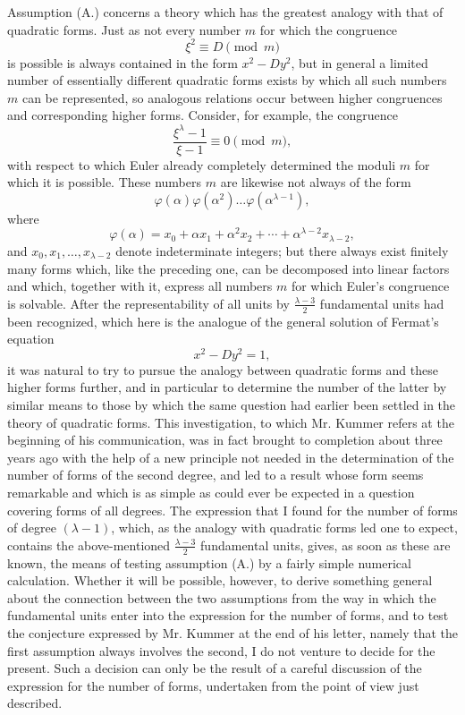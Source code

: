 \documentclass[11pt]{article}
\begin{document}
Assumption (A.) concerns a theory which has the greatest analogy with that of quadratic forms. Just as not every number $m$ for which the congruence
\[
\xi^2 \equiv D \pmod{m}
\]
is possible is always contained in the form $x^2-Dy^2$, but in general a limited number of essentially different quadratic forms exists by which all such numbers $m$ can be represented, so analogous relations occur between higher congruences and corresponding higher forms. Consider, for example, the congruence
\[
\frac{\xi^\lambda-1}{\xi-1}\equiv 0 \pmod{m},
\]
with respect to which Euler already completely determined the moduli $m$ for which it is possible. These numbers $m$ are likewise not always of the form
\[
\varphi(\alpha)\varphi(\alpha^2)\ldots\varphi(\alpha^{\lambda-1}),
\]
where
\[
\varphi(\alpha)=x_0+\alpha x_1+\alpha^2x_2+\cdots+\alpha^{\lambda-2}x_{\lambda-2},
\]
and $x_0,x_1,\ldots,x_{\lambda-2}$ denote indeterminate integers; but there always exist finitely many forms which, like the preceding one, can be decomposed into linear factors and which, together with it, express all numbers $m$ for which Euler's congruence is solvable. After the representability of all units by $\frac{\lambda-3}{2}$ fundamental units had been recognized, which here is the analogue of the general solution of Fermat's equation
\[
x^2-Dy^2=1,
\]
it was natural to try to pursue the analogy between quadratic forms and these higher forms further, and in particular to determine the number of the latter by similar means to those by which the same question had earlier been settled in the theory of quadratic forms. This investigation, to which Mr. Kummer refers at the beginning of his communication, was in fact brought to completion about three years ago with the help of a new principle not needed in the determination of the number of forms of the second degree, and led to a result whose form seems remarkable and which is as simple as could ever be expected in a question covering forms of all degrees. The expression that I found for the number of forms of degree $(\lambda-1)$, which, as the analogy with quadratic forms led one to expect, contains the above-mentioned $\frac{\lambda-3}{2}$ fundamental units, gives, as soon as these are known, the means of testing assumption (A.) by a fairly simple numerical calculation. Whether it will be possible, however, to derive something general about the connection between the two assumptions from the way in which the fundamental units enter into the expression for the number of forms, and to test the conjecture expressed by Mr. Kummer at the end of his letter, namely that the first assumption always involves the second, I do not venture to decide for the present. Such a decision can only be the result of a careful discussion of the expression for the number of forms, undertaken from the point of view just described.
\end{document}
